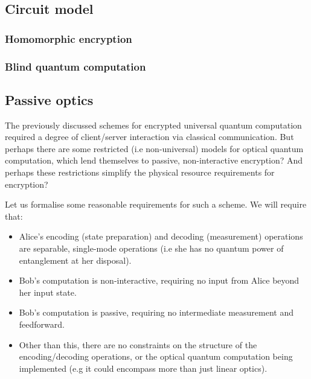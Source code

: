 
%
%

\subsection{Circuit model} 


%
%

\subsubsection{Homomorphic encryption} 


%
%

\subsubsection{Blind quantum computation} 


%
%

\subsection{Passive optics} 

The previously discussed schemes for encrypted universal quantum computation required a degree of client/server interaction via classical communication. But perhaps there are some restricted (i.e non-universal) models for optical quantum computation, which lend themselves to passive, non-interactive encryption? And perhaps these restrictions simplify the physical resource requirements for encryption?

Let us formalise some reasonable requirements for such a scheme. We will require that:
\begin{itemize}
\item Alice's encoding (state preparation) and decoding (measurement) operations are separable, single-mode operations (i.e she has no quantum power of entanglement at her disposal).
\item Bob's computation is non-interactive, requiring no input from Alice beyond her input state.
\item Bob's computation is passive, requiring no intermediate measurement and feedforward.
\item Other than this, there are no constraints on the structure of the encoding/decoding operations, or the optical quantum computation being implemented (e.g it could encompass more than just linear optics).
\end{itemize}

